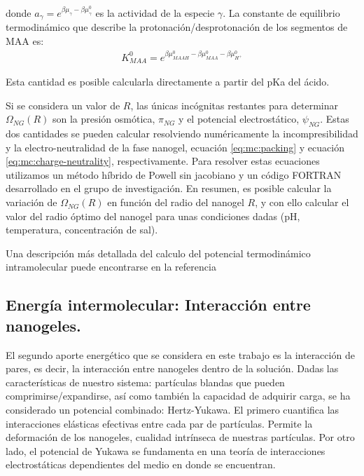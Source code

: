 	\noindent donde $a_\gamma = e^{\beta\mu_\gamma-\beta\mu_\gamma^0}$ es la actividad de la especie $\gamma$. 
	La constante de equilibrio termodin\'amico que describe la protonaci\'on/desprotonaci\'on de los segmentos de MAA es:
	\begin{align}
		K^0_{MAA}= e^{\beta\mu^0_{MAAH}-\beta\mu^0_{MAA}-\beta\mu^0_{H^+}}
	\end{align}
	
	\noindent Esta cantidad es posible calcularla directamente a partir del pKa del \'acido.
	
	
	Si se considera  un valor de  $R$, las \'unicas inc\'ognitas restantes para determinar $\Omega_{NG}(R)$ son la presi\'on osm\'otica, $\pi_{NG}$ y el potencial electrost\'atico, $\psi_{NG}$.
	Estas dos cantidades se pueden calcular resolviendo num\'ericamente la incompresibilidad y la electro-neutralidad de la fase nanogel, ecuaci\'on \ref{eq:mc:packing} y ecuaci\'on \ref{eq:mc:charge-neutrality}, respectivamente.
	Para resolver estas ecuaciones utilizamos un m\'etodo h\'ibrido de Powell sin jacobiano y un c\'odigo FORTRAN desarrollado en el grupo de investigaci\'on.
	En resumen, es posible calcular la variaci\'on de  $\Omega_{NG}(R)$ en funci\'on del radio del nanogel $R$, y con ello calcular el valor del radio \'optimo del nanogel para unas condiciones dadas (pH, temperatura, concentraci\'on de sal).
	
	Una descripci\'on m\'as detallada del calculo del potencial termodin\'amico intramolecular puede encontrarse en la referencia  \cite{perez2021thermodynamic}
	
	\subsection{Energ\'ia intermolecular: Interacci\'on entre nanogeles.}\label{sec:mc:energia_intra}
	
	El segundo aporte energ\'etico que se considera en este trabajo es la interacci\'on de pares, es decir, la interacci\'on entre nanogeles dentro de la soluci\'on.
	Dadas las caracter\'isticas de nuestro sistema: part\'iculas blandas que pueden comprimirse/expandirse, as\'i como tambi\'en la capacidad de adquirir carga, se ha considerado un potencial combinado: Hertz-Yukawa.
	El primero cuantifica las interacciones el\'asticas efectivas entre cada par de part\'iculas. Permite la deformaci\'on de los nanogeles, cualidad intr\'inseca de nuestras part\'iculas.
	Por otro lado, el potencial de Yukawa se fundamenta en una teor\'ia de interacciones electrost\'aticas dependientes del medio en donde se encuentran.
	
